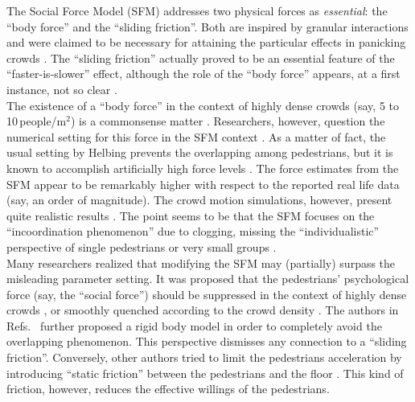 \documentclass[preprint,12pt]{elsarticle}
\begin{document}
The Social Force Model (SFM) addresses two physical forces as 
\textit{essential}: the ``body force'' and the ``sliding friction''. Both are 
inspired by granular interactions and were claimed to be necessary  
for attaining the particular effects in panicking crowds \cite{helbing_2000}. 
The ``sliding friction'' actually proved to be an essential feature of the 
``faster-is-slower'' effect, although the role of the ``body force'' appears, 
at a first instance, not so clear \cite{dorso_2005,dorso_2007,dorso_2011}. \\ 

The existence of a ``body force'' in the context of highly dense crowds (say, 5 
to 10$\,$people/m$^2$) is a commonsense matter \cite{henein_2007,fruin_1993}. 
Researchers, however, question the numerical setting for this force in 
the SFM context \cite{lakoba_2005}. As a matter of fact, the usual setting by 
Helbing prevents the overlapping among pedestrians, but it is known to 
accomplish artificially high force levels 
\cite{helbing_2000,lakoba_2005,langston_2006,lin_2017}. The force estimates 
from the SFM appear to be remarkably higher with respect to the reported real 
life data (say, an order of magnitude). The crowd motion simulations, however, 
present quite realistic results \cite{lakoba_2005,langston_2006,dorso_2017}. 
The 
point seems to be that the SFM focuses on the ``incoordination phenomenon'' due 
to clogging, missing the ``individualistic'' perspective  of single pedestrians 
or very small groups \cite{helbing_2000,henein_2007,narain_2009}.  \\ 

Many researchers realized that modifying the SFM may (partially) surpass the 
misleading parameter setting. It was proposed that the pedestrians' 
psychological force (say, the ``social force'') should be suppressed in the 
context of highly dense crowds 
\cite{pelechano_2007,moussaid_2011,alonso_2014,bottinelli_2017}, or smoothly 
quenched according to the crowd density \cite{song_2019}. The authors in 
Refs.~\cite{kabalan_2017,jebrane_2019} further proposed a rigid body model in 
order to completely avoid the overlapping phenomenon. This perspective 
dismisses 
any connection to a ``sliding friction''. Conversely, other authors tried to 
limit the pedestrians acceleration by introducing ``static friction'' between 
the pedestrians and the floor \cite{wang_2019}. This kind of friction, however, 
reduces the effective willings of the pedestrians.  \\  
\end{document}
